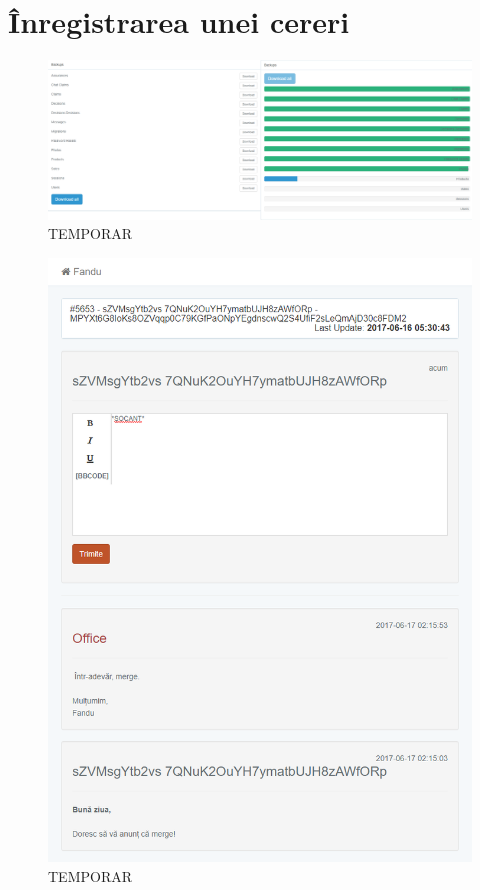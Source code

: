 \section{Înregistrarea unei cereri}

	\begin{figure}
		\includegraphics[width=\linewidth]{../imagini/backups.png}
		\caption{TEMPORAR}
		\label{fig:TEMP}
	\end{figure}
	\begin{figure}
		\includegraphics[width=\linewidth]{../imagini/claim_mesaje.png}
		\caption{TEMPORAR}
		\label{fig:TEMP}
	\end{figure}
